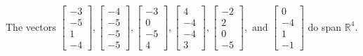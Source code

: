 \begin{exercise}
\begin{exerciseStatement}
  \end{exerciseStatement}
  \begin{exerciseAnswer}
   The vectors \(\left[\begin{array}{r}
-3 \\
-5 \\
1 \\
-4
\end{array}\right] , \left[\begin{array}{r}
-4 \\
-5 \\
-5 \\
-5
\end{array}\right] , \left[\begin{array}{r}
-3 \\
0 \\
-5 \\
4
\end{array}\right] , \left[\begin{array}{r}
4 \\
-4 \\
-4 \\
3
\end{array}\right] , \left[\begin{array}{r}
-2 \\
2 \\
0 \\
-5
\end{array}\right] , \text{ and } \left[\begin{array}{r}
0 \\
-4 \\
1 \\
-1
\end{array}\right]\) 
  	 do  
	span \(\mathbb{R}^4\).
  


  \end{exerciseAnswer}
\end{exercise}